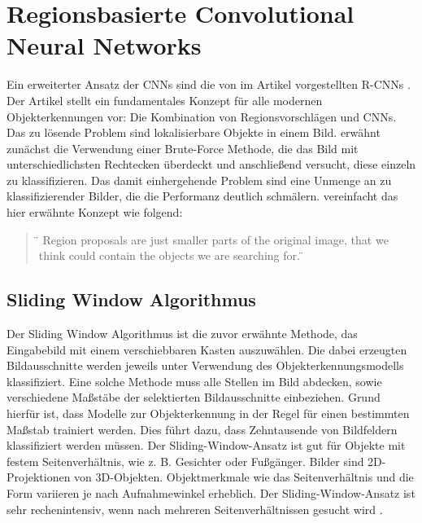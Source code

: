 \section{Regionsbasierte Convolutional Neural Networks}

Ein erweiterter Ansatz der \acp{CNN} sind die von \citeauthor{DBLP:journals/corr/GirshickDDM13} im Artikel  vorgestellten \acp{R-CNN} \cite{DBLP:journals/corr/GirshickDDM13}. Der Artikel stellt ein fundamentales Konzept für alle modernen Objekterkennungen vor: Die Kombination von Regionsvorschlägen und \acp{CNN}.
Das zu lösende Problem sind lokalisierbare Objekte in einem Bild. \citeauthor{DBLP:journals/corr/GirshickDDM13} erwähnt zunächst die Verwendung einer Brute-Force Methode, die das Bild mit unterschiedlichsten Rechtecken überdeckt und anschließend versucht, diese einzeln zu klassifizieren. Das damit einhergehende Problem sind eine Unmenge an zu klassifizierender Bilder, die die Performanz deutlich schmälern. \citeauthor{selfouly-rcnn} vereinfacht das hier erwähnte Konzept wie folgend:

\begin{quote}
	\"{} Region proposals are just smaller parts of the original image, that we think could contain the objects we are searching for. \cite{selfouly-rcnn} \"{}
\end{quote}

\subsection{Sliding Window Algorithmus}

Der Sliding Window Algorithmus ist die zuvor erwähnte Methode, das Eingabebild mit einem verschiebbaren Kasten auszuwählen. Die dabei erzeugten Bildausschnitte werden jeweils unter Verwendung des Objekterkennungsmodells klassifiziert. Eine solche Methode muss alle Stellen im Bild abdecken, sowie verschiedene Maßstäbe der selektierten Bildausschnitte einbeziehen. Grund hierfür ist, dass Modelle zur Objekterkennung in der Regel für einen bestimmten Maßstab trainiert werden. Dies führt dazu, dass Zehntausende von Bildfeldern klassifiziert werden müssen. Der Sliding-Window-Ansatz ist gut für Objekte mit festem Seitenverhältnis, wie z. B. Gesichter oder Fußgänger. Bilder sind 2D-Projektionen von 3D-Objekten. Objektmerkmale wie das Seitenverhältnis und die Form variieren je nach Aufnahmewinkel erheblich. Der Sliding-Window-Ansatz ist sehr rechenintensiv, wenn nach mehreren Seitenverhältnissen gesucht wird \cite{learnopencv}.


